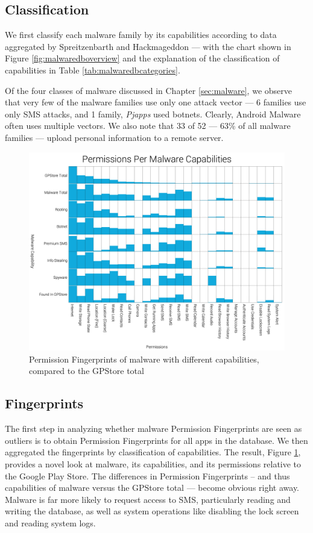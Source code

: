 \subsection{Classification}
We first classify each malware family by its capabilities according to data aggregated by Spreitzenbarth\citep{spreitzenbarth2013} and Hackmageddon\citep{hackmageddon2011} --- with the chart shown in Figure \ref{fig:malwaredboverview} and the explanation of the classification of capabilities in Table \ref{tab:malwaredbcategories}.

Of the four classes of malware discussed in Chapter \ref{sec:malware}, we observe that very few of the malware families use only one attack vector --- 6 families use only SMS attacks, and 1 family, \textit{Pjapps} used botnets. Clearly, Android Malware often uses multiple vectors. We also note that 33 of 52 --- 63\% of all malware families --- upload personal information to a remote server. 

\begin{figure}[h]
\begin{center}
\includegraphics[width=1.0\columnwidth]{figs/MalwareCapabiltiesPermissions}
\caption{Permission Fingerprints of malware with different capabilities, compared to the GPStore total}
\label{fig:malwarefingerprint}
\end{center}
\end{figure}

\subsection{Fingerprints}
The first step in analyzing whether malware Permission Fingerprints are seen as outliers is to obtain Permission Fingerprints for all apps in the database. We then aggregated the fingerprints by classification of capabilities. The result, Figure \ref{fig:malwarefingerprint}, provides a novel look at malware, its capabilities, and its permissions relative to the Google Play Store. The differences in Permission Fingerprints -- and thus capabilities of malware versus the GPStore total --- become obvious right away. Malware is far more likely to request access to SMS, particularly reading and writing the database, as well as system operations like disabling the lock screen and reading system logs. 

